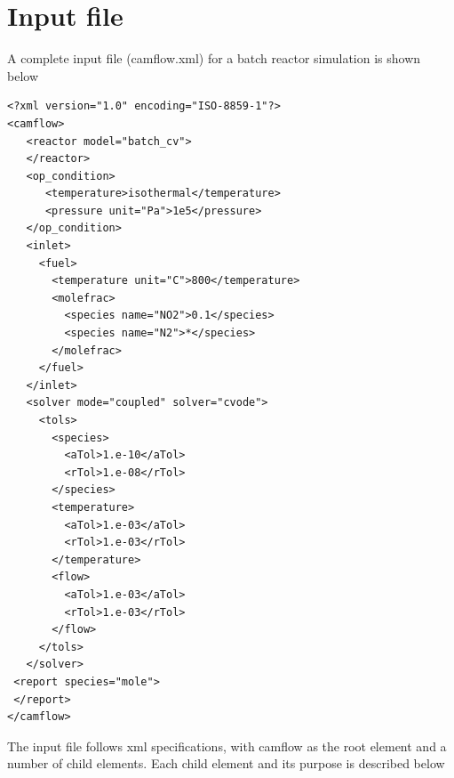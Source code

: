 \section{Input file}
A complete input file (camflow.xml) for a batch reactor simulation is shown below
{\scriptsize{
 \begin{verbatim}
<?xml version="1.0" encoding="ISO-8859-1"?>
<camflow>
   <reactor model="batch_cv">
   </reactor>
   <op_condition>
      <temperature>isothermal</temperature>	  
      <pressure unit="Pa">1e5</pressure>
   </op_condition>
   <inlet>
     <fuel>       
       <temperature unit="C">800</temperature>       
       <molefrac>
         <species name="NO2">0.1</species>
         <species name="N2">*</species>
       </molefrac>
     </fuel>
   </inlet>
   <solver mode="coupled" solver="cvode">
     <tols>
       <species>
         <aTol>1.e-10</aTol>
         <rTol>1.e-08</rTol>	  
       </species>
       <temperature>
         <aTol>1.e-03</aTol>
         <rTol>1.e-03</rTol>	  
       </temperature>
       <flow>
         <aTol>1.e-03</aTol>
         <rTol>1.e-03</rTol>	  
       </flow>
     </tols>
   </solver>
 <report species="mole">
 </report>
</camflow>

\end{verbatim}}
}
The input file follows xml specifications, with camflow as the root element and a number of child elements.
Each child element and its purpose is described below
